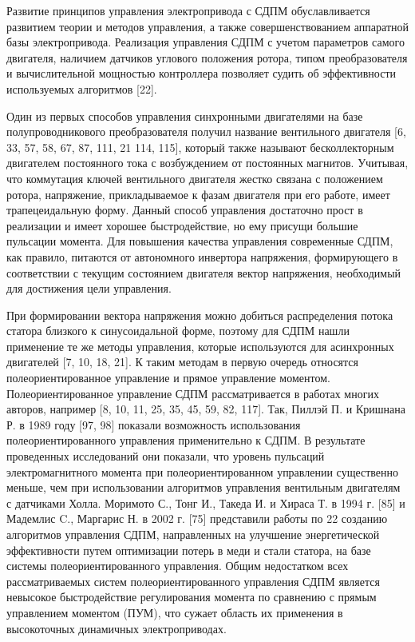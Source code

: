 Развитие принципов управления электропривода с СДПМ обуславливается развитием теории и методов управления, а также совершенствованием аппаратной базы электропривода. Реализация управления СДПМ с учетом параметров самого двигателя, наличием датчиков углового положения ротора, типом преобразователя и вычислительной мощностью контроллера позволяет судить об эффективности используемых алгоритмов [22]. 

Один из первых способов управления синхронными двигателями на базе полупроводникового преобразователя получил название вентильного двигателя [6, 33, 57, 58, 67, 87, 111, 21 114, 115], который также называют бесколлекторным двигателем постоянного тока с возбуждением от постоянных магнитов. Учитывая, что коммутация ключей вентильного двигателя жестко связана с положением ротора, напряжение, прикладываемое к фазам двигателя при его работе, имеет трапецеидальную форму. Данный способ управления достаточно прост в реализации и имеет хорошее быстродействие, но ему присущи большие пульсации момента. 
Для повышения качества управления современные СДПМ, как правило, питаются от автономного инвертора напряжения, формирующего в соответствии с текущим состоянием двигателя вектор напряжения, необходимый для достижения цели управления. 

При формировании вектора напряжения можно добиться распределения потока статора близкого к синусоидальной форме, поэтому для СДПМ нашли применение те же методы управления, которые используются для асинхронных двигателей [7, 10, 18, 21]. К таким методам в первую очередь относятся полеориентированное управление и прямое управление моментом. 
Полеориентированное управление СДПМ рассматривается в работах многих авторов, например [8, 10, 11, 25, 35, 45, 59, 82, 117]. Так, Пиллэй П. и Кришнана Р. в 1989 году [97, 98] показали возможность использования полеориентированного управления применительно к СДПМ. В результате проведенных исследований они показали, что уровень пульсаций электромагнитного момента при полеориентированном управлении существенно меньше, чем при использовании алгоритмов управления вентильным двигателям с датчиками Холла. 
Моримото С., Тонг И., Такеда И. и Хираса Т. в 1994 г. [85] и Мадемлис C., Маргарис Н. в 2002 г. [75] представили работы по 22 созданию алгоритмов управления СДПМ, направленных на улучшение энергетической эффективности путем оптимизации потерь в меди и стали статора, на базе системы полеориентированного управления. 
Общим недостатком всех рассматриваемых систем полеориентированного управления СДПМ является невысокое быстродействие регулирования момента по сравнению с прямым управлением моментом (ПУМ), что сужает область их применения в высокоточных динамичных электроприводах. 


